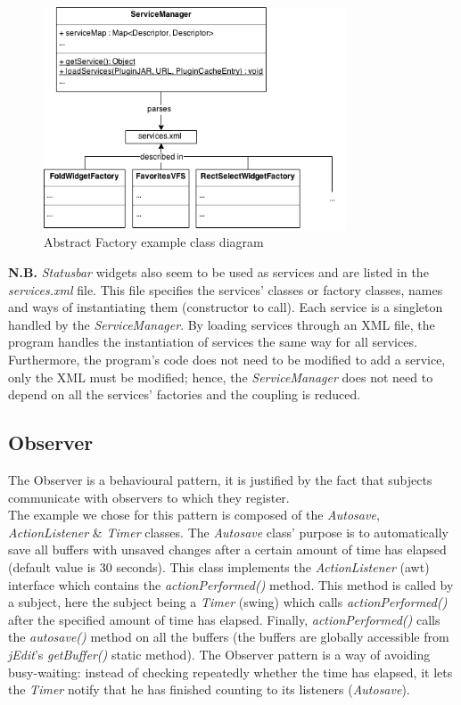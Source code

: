 \begin{figure}[h!]
    \includegraphics[width=0.8\textwidth]{images/abstractfactory.png}
    \centering
    \caption{Abstract Factory example class diagram}
\end{figure}

\begin{framehint2}
    \textbf{N.B.} \emph{Statusbar} widgets also seem to be used as services and are
    listed in the \emph{services.xml} file. This file specifies the services'
    classes or factory classes, names and ways of instantiating them
    (constructor to call).
    Each service is a singleton handled by the \emph{ServiceManager}.
    By loading services through an XML file, the program handles the
    instantiation of services the same way for all services. Furthermore, the
    program's code does not need to be modified to add a service, only the
    XML must be modified; hence, the \emph{ServiceManager} does not need to
    depend on all the services' factories and the coupling is reduced.
\end{framehint2}
\newpage

\subsection{Observer}
The Observer is a behavioural pattern, it is justified by the fact that
subjects communicate with observers to which they register.\\

The example we chose for this pattern is composed of the
\emph{Autosave}\footnotemark[1]{}, \emph{ActionListener} \& \emph{Timer} classes.
The \emph{Autosave} class' purpose is to automatically save all buffers with
unsaved changes after a certain amount of time has elapsed (default
value is 30 seconds). This class implements the \emph{ActionListener}
(awt) interface which contains the \emph{actionPerformed()} method. This
method is called by a subject, here the subject being a \emph{Timer}
(swing) which calls \emph{actionPerformed()} after the specified amount
of time has elapsed. Finally, \emph{actionPerformed()} calls the
\emph{autosave()} method on all the buffers (the buffers are globally
accessible from \emph{jEdit}'s \emph{getBuffer()} static method). The
Observer pattern is a way of avoiding busy-waiting: instead of checking
repeatedly whether the time has elapsed, it lets the \emph{Timer} notify
that he has finished counting to its listeners (\emph{Autosave}).

